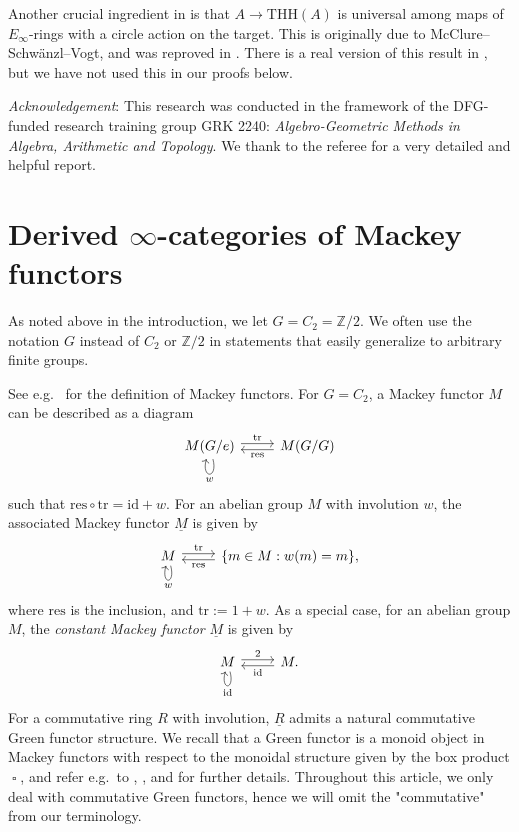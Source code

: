 \documentclass[10pt]{amsart}
\theoremstyle{definition}
\numberwithin{equation}{section}
\newcommand{\Z}{\mathbb{Z}}
\newcommand{\ul}{\underline}
\newcommand{\id}{\mathrm{id}}
\DeclareMathOperator{\sotimes}{\square}
\newcommand{\THH}{\mathrm{THH}}
\newcommand{\tr}{\mathrm{tr}}
\newcommand{\res}{\mathrm{res}}
\begin{document}
Another crucial ingredient in \cite{BMS19} is that $A \to \THH(A)$ is universal among maps of $E_{\infty}$-rings with a circle action on the target. This is originally due to McClure–Schw\"{a}nzl–Vogt, and was reproved in \cite[Proposition IV.2.2]{NS}. There is a real version of this result in 
\cite[Definition 5.2 and Remark 5.4]{QS22}, but we have not used this in our proofs below.



\emph{Acknowledgement}: This research was conducted in the framework of the DFG-
funded research training group GRK 2240: \emph{Algebro-Geometric Methods in Algebra,
Arithmetic and Topology}.
We thank to the referee for a very detailed and helpful report.

\section{Derived \texorpdfstring{$\infty$-}{infinity }categories of Mackey functors}
\label{sec2}


 
As noted above in the introduction, we let $G=C_2=\Z/2$.
We often use the notation $G$ instead of $C_2$ or $\Z/2$ in statements that easily generalize to arbitrary finite groups.


See e.g.\ \cite[Definition 2.1]{LM06} for the definition of Mackey functors.
For $G=C_2$, a Mackey functor $M$ can be described as a diagram
\[
\begin{tikzcd}
M(G/e)\ar[loop below,"w"]\ar[r,shift left=0.5ex,"\tr"]\ar[r,shift right=0.5ex,leftarrow,"\res"']&
M(G/G)
\end{tikzcd}
\]
such that $\res\circ \tr = \id + w$.
For an abelian group $M$ with involution $w$,
the associated Mackey functor $\ul{M}$ is given by
\[
\begin{tikzcd}
M\ar[loop below,"w"]\ar[r,shift left=0.5ex,"\tr"]\ar[r,shift right=0.5ex,leftarrow,"\res"']&
\{m\in M:w(m)=m\},
\end{tikzcd}
\]
where $\res$ is the inclusion, and $\tr:=1+w$.
As a special case,
for an abelian group $M$,
the \emph{constant Mackey functor} $\ul{M}$ is given by
\[
\begin{tikzcd}
M\ar[loop below,"\id"]\ar[r,shift left=0.5ex,"2"]\ar[r,shift right=0.5ex,leftarrow,"\id"']&
M.
\end{tikzcd}
\]
For a commutative ring $R$ with involution, $\ul{R}$ admits a natural commutative Green functor structure. We recall that a Green functor is a monoid object in Mackey functors with respect to the monoidal structure given by the box product $\sotimes$, and refer e.g.\ to \cite[p.\ 61]{lewis88}, \cite[section 1.3]{Bouc}, and \cite[sections A.3 and A.4]{HP23} for further details. Throughout this article, we only deal with commutative Green functors, hence we will omit the "commutative" from our terminology.
\end{document}
